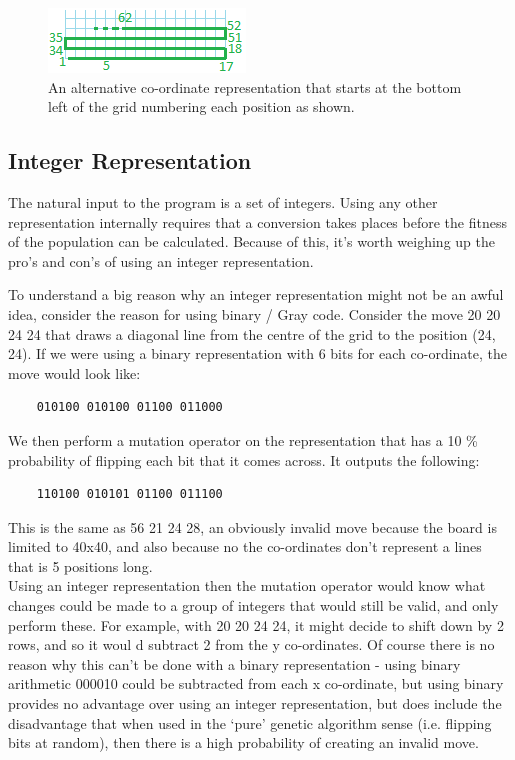 \documentclass[]{report}
\begin{document}
\begin{figure}
	\centering
	\includegraphics{figures/alternativeRepresentation.png}
	\caption{An alternative co-ordinate representation that starts at the bottom left of the grid numbering each position as shown.}
	\label{alternativePositioning}
\end{figure}

\subsection{Integer Representation}

The natural input to the program is a set of integers. Using any other representation internally requires that a conversion takes places before the fitness of the population can be calculated. Because of this, it's worth weighing up the pro's and con's of using an integer representation.

To understand a big reason why an integer representation might not be an awful idea, consider the reason for using binary / Gray code. Consider the move 20 20 24 24 that draws a diagonal line from the centre of the grid to the position (24, 24). If we were using a binary representation with 6 bits for each co-ordinate, the move would look like:

\begin{center}
\begin{verbatim}
	010100 010100 01100 011000
\end{verbatim}
\end{center}

We then perform a mutation operator on the representation that has a 10 \% probability of flipping each bit that it comes across. It outputs the following:

\begin{verbatim}
	110100 010101 01100 011100
\end{verbatim}

This is the same as 56 21 24 28, an obviously invalid move because the board is limited to 40x40, and also because no the co-ordinates don't represent a lines that is 5 positions long. \\

Using an integer representation then the mutation operator would know what changes could be made to a group of integers that would still be valid, and only perform these. For example, with 20 20 24 24, it might decide to shift down by 2 rows, and so it woul	d subtract 2 from the y co-ordinates. Of course there is no reason why this can't be done with a binary representation - using binary arithmetic 000010 could be subtracted from each x co-ordinate, but using binary provides no advantage over using an integer representation, but does include the disadvantage that when used in the `pure' genetic algorithm sense (i.e. flipping bits at random), then there is a high probability of creating an invalid move. \\
\end{document}

